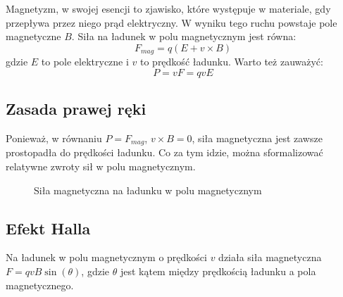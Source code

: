 \documentclass{../notatki}
\begin{document}
Magnetyzm, w swojej esencji to zjawisko, które występuje w materiale, gdy
przepływa przez niego prąd elektryczny. W wyniku tego ruchu powstaje pole
magnetyczne $B$. Siła na ładunek w polu magnetycznym jest równa:
$$
F_{mag} =q(E + v \times B)
$$
gdzie $E$ to pole elektryczne i $v$ to prędkość ładunku.
Warto też zauważyć:
$$
P = vF = qvE
$$

\subsection{Zasada prawej ręki}

Ponieważ, w równaniu $P = F_{mag}$, $v \times B = 0$, siła
magnetyczna jest zawsze prostopadła do prędkości ładunku.
Co za tym idzie, można sformalizować relatywne zwroty sił w polu magnetycznym.
\begin{figure}[h]
  \centering
  \caption{Siła magnetyczna na ładunku w polu magnetycznym}
\end{figure}

\subsection{Efekt Halla}

Na ładunek w polu magnetycznym o prędkości $v$ działa siła
magnetyczna $F = qvB \sin(\theta)$, gdzie $\theta$ jest kątem między
prędkością ładunku a pola magnetycznego.

\begin{figure}[h]
  \centering
\end{figure}
\end{document}
